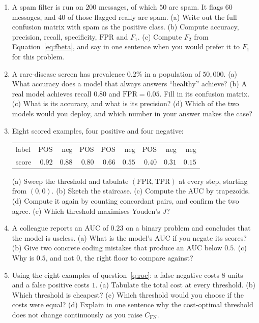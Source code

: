 \documentclass[11pt]{article}
\newcommand{\FN}{\mathrm{FN}}
\newcommand{\TPR}{\mathrm{TPR}}
\newcommand{\FPR}{\mathrm{FPR}}
\begin{document}
\begin{enumerate}[leftmargin=*]
  \item\label{q:cm} A spam filter is run on $200$ messages, of which $50$ are
    spam. It flags $60$ messages, and $40$ of those flagged really are spam.
    (a) Write out the full confusion matrix with spam as the positive class.
    (b) Compute accuracy, precision, recall, specificity, $\FPR$ and $F_1$.
    (c) Compute $F_2$ from Equation~\eqref{eq:fbeta}, and say in one sentence
    when you would prefer it to $F_1$ for this problem.

  \item\label{q:imb} A rare-disease screen has prevalence $0.2\%$ in a
    population of $50{,}000$. (a) What accuracy does a model that always answers
    ``healthy'' achieve? (b) A real model achieves recall $0.80$ and
    $\FPR = 0.05$. Fill in its confusion matrix. (c) What is its accuracy, and
    what is its precision? (d) Which of the two models would you deploy, and
    which number in your answer makes the case?

  \item\label{q:roc} Eight scored examples, four positive and four negative:
    \begin{center}\small
    \begin{tabular}{@{}lrrrrrrrr@{}}
    \toprule
    label & POS & neg & POS & POS & neg & POS & neg & neg\\
    score & $0.92$ & $0.88$ & $0.80$ & $0.66$ & $0.55$ & $0.40$ & $0.31$ & $0.15$\\
    \bottomrule
    \end{tabular}
    \end{center}
    (a) Sweep the threshold and tabulate $(\FPR, \TPR)$ at every step, starting
    from $(0,0)$. (b) Sketch the staircase. (c) Compute the AUC by trapezoids.
    (d) Compute it again by counting concordant pairs, and confirm the two agree.
    (e) Which threshold maximises Youden's $J$?

  \item\label{q:invert} A colleague reports an AUC of $0.23$ on a binary problem
    and concludes that the model is useless. (a) What is the model's AUC if you
    negate its scores? (b) Give two concrete coding mistakes that produce an AUC
    below $0.5$. (c) Why is $0.5$, and not $0$, the right floor to compare
    against?

  \item\label{q:cost} Using the eight examples of question~\ref{q:roc}: a false
    negative costs $8$ units and a false positive costs $1$. (a) Tabulate the
    total cost at every threshold. (b) Which threshold is cheapest? (c) Which
    threshold would you choose if the costs were equal? (d) Explain in one
    sentence why the cost-optimal threshold does not change continuously as you
    raise $C_{\FN}$.


\end{enumerate}
\end{document}
